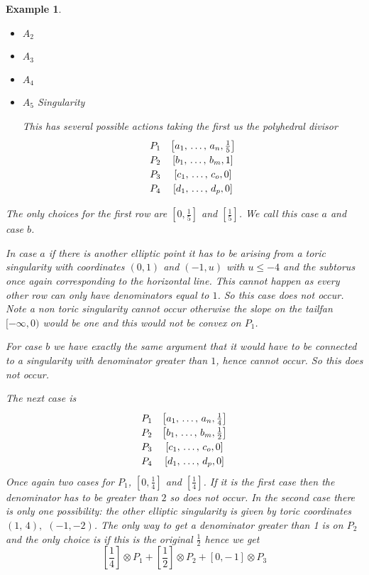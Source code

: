 \documentclass[11pt]{amsart}
\theoremstyle{plain}
\newtheorem{ex}[thm]{Example}
\begin{document}
\begin{ex}
\begin{itemize}
\item $A_2$

\item $A_3$

\item $A_4$

\item \begin{bf} $A_5$ Singularity \end{bf}

This has several possible actions taking the first us the polyhedral divisor 
\[\def\arraystretch{1.2}
\begin{array}{cc}
P_1 & \left[ a_1, \, \dots , \, a_n, \frac{1}{5} \right] \\ 
P_2 & \left[b_1 , \, \dots, \, b_m, 1\right] \\
P_3 & \left[c_1, \, \dots, \, c_o, 0\right] \\
P_4 & \left[d_1, \, \dots, \, d_p, 0\right]  \\
\end{array}
\]
\end{itemize}
The only choices for the first row are $[0, \frac{1}{5}]$ and $[\frac{1}{5}]$. We call this case $a$ and case $b$. 

In case $a$ if there is another elliptic point it has to be arising from a toric singularity with coordinates $(0, 1)$ and $(-1, u)$ with $u \leq -4$ and the subtorus once again corresponding to the horizontal line.
This cannot happen as every other row can only have denominators equal to $1$. So this case does not occur. Note a non toric singularity cannot occur otherwise the slope on the tailfan $[-\infty , 0)$ would be one and this would not be convex on $P_1$.

For case $b$ we have exactly the same argument that it would have to be connected to a singularity with denominator greater than $1$, hence cannot occur. So this does not occur. 


The next case is 
\[\def\arraystretch{1.2}
\begin{array}{cc}
P_1 & \left[ a_1, \, \dots , \, a_n, \frac{1}{4} \right] \\ 
P_2 & \left[b_1 , \, \dots, \, b_m, \frac{1}{2} \right] \\
P_3 & \left[c_1, \, \dots, \, c_o, 0\right] \\
P_4 & \left[d_1, \, \dots, \, d_p, 0\right]  \\
\end{array}
\]
Once again two cases for $P_1$,  $[0, \frac{1}{4}]$ and $[\frac{1}{4}]$. If it is the first case then the denominator has to be greater than $2$ so does not occur. In the second case there is only one possibility: the other elliptic singularity is given by toric coordinates $(1, \, 4),$ $(-1, -2)$. The only way to get a denominator greater than 1 is on $P_2$ and  the only choice is if this is the original $\frac{1}{2}$ hence we get
\[
\left[\frac{1}{4} \right] \otimes P_1 + \left[\frac{1}{2} \right] \otimes P_2 + [0, -\, 1] \otimes P_3
\]


\end{ex}
\end{document}
